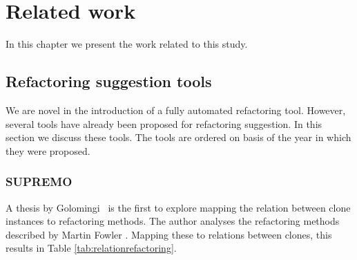 \chapter{Related work} \label{ch:related_work}
In this chapter we present the work related to this study.

\section{Refactoring suggestion tools}
We are novel in the introduction of a fully automated refactoring tool. However, several tools have already been proposed for refactoring suggestion. In this section we discuss these tools. The tools are ordered on basis of the year in which they were proposed.

\subsection{SUPREMO}
A thesis by Golomingi~\cite{koni2001scenario} is the first to explore mapping the relation between clone instances to refactoring methods. The author analyses the refactoring methods described by Martin Fowler \cite{fowler1999refactoring}. Mapping these to relations between clones, this results in Table \ref{tab:relationrefactoring}.

